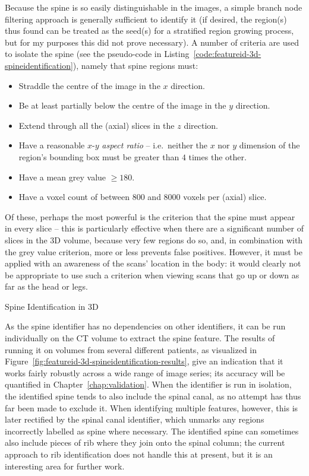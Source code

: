 Because the spine is so easily distinguishable in the images, a simple branch node filtering approach is generally sufficient to identify it (if desired, the region(s) thus found can be treated as the seed(s) for a stratified region growing process, but for my purposes this did not prove necessary). A number of criteria are used to isolate the spine (see the pseudo-code in Listing~\ref{code:featureid-3d-spineidentification}), namely that spine regions must:
%
\begin{itemize}

\item Straddle the centre of the image in the $x$ direction.
\item Be at least partially below the centre of the image in the $y$ direction.
\item Extend through all the (axial) slices in the $z$ direction.
\item Have a reasonable $x$-$y$ \emph{aspect ratio} -- i.e.~neither the $x$ nor $y$ dimension of the region's bounding box must be greater than $4$ times the other.
\item Have a mean grey value $\ge 180$.
\item Have a voxel count of between $800$ and $8000$ voxels per (axial) slice.

\end{itemize}
%
Of these, perhaps the most powerful is the criterion that the spine must appear in every slice -- this is particularly effective when there are a significant number of slices in the 3D volume, because very few regions do so, and, in combination with the grey value criterion, more or less prevents false positives. However, it must be applied with an awareness of the scans' location in the body: it would clearly not be appropriate to use such a criterion when viewing scans that go up or down as far as the head or legs.

\begin{stulisting}[t]
\caption{Spine Identification in 3D}
\label{code:featureid-3d-spineidentification}

\end{stulisting}

As the spine identifier has no dependencies on other identifiers, it can be run individually on the CT volume to extract the spine feature. The results of running it on volumes from several different patients, as visualized in Figure~\ref{fig:featureid-3d-spineidentification-results}, give an indication that it works fairly robustly across a wide range of image series; its accuracy will be quantified in Chapter~\ref{chap:validation}. When the identifier is run in isolation, the identified spine tends to also include the spinal canal, as no attempt has thus far been made to exclude it. When identifying multiple features, however, this is later rectified by the spinal canal identifier, which unmarks any regions incorrectly labelled as spine where necessary. The identified spine can sometimes also include pieces of rib where they join onto the spinal column; the current approach to rib identification does not handle this at present, but it is an interesting area for further work.

